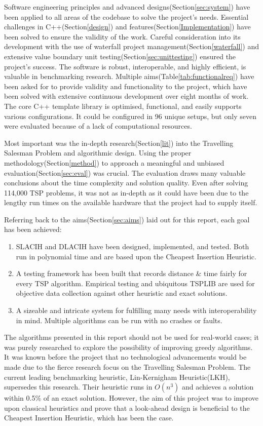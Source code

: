 Software engineering principles and advanced designs(Section\ref{sec:system}) have been applied to all areas of the codebase to solve the project's needs. Essential challenges in C++(Section\ref{design}) and features(Section\ref{Implementation}) have been solved to ensure the validity of the work. Careful consideration into its development with the use of waterfall project management(Section\ref{waterfall}) and extensive value boundary unit testing(Section\ref{sec:unittesting}) ensured the project's success. The software is robust, interoperable, and highly efficient, is valuable in benchmarking research. Multiple aims(Table\ref{tab:functionalreq}) have been asked for to provide validity and functionality to the project, which have been solved with extensive continuous development over eight months of work. The core C++ template library is optimised, functional, and easily supports various configurations. It could be configured in 96 unique setups, but only seven were evaluated because of a lack of computational resources. 

Most important was the in-depth research(Section\ref{lit}) into the Travelling Salesman Problem and algorithmic design. Using the proper methodology(Section\ref{method}) to approach a meaningful and unbiased evaluation(Section\ref{sec:eval}) was crucial. The evaluation draws many valuable conclusions about the time complexity and solution quality. Even after solving 114,000 TSP problems, it was not as in-depth as it could have been due to the lengthy run times on the available hardware that the project had to supply itself.

Referring back to the aims(Section\ref{sec:aims}) laid out for this report, each goal has been achieved:
\begin{enumerate}
  \item SLACIH and DLACIH have been designed, implemented, and tested. Both run in polynomial time and are based upon the Cheapest Insertion Heuristic.
  \item A testing framework has been built that records distance \& time fairly for every TSP algorithm. Empirical testing and ubiquitous TSPLIB are used for objective data collection against other heuristic and exact solutions.
  \item A sizeable and intricate system for fulfilling many needs with interoperability in mind. Multiple algorithms can be run with no crashes or faults.
\end{enumerate}

The algorithms presented in this report should not be used for real-world cases; it was purely researched to explore the possibility of improving greedy algorithms. It was known before the project that no technological advancements would be made due to the fierce research focus on the Travelling Salesman Problem. The current leading benchmarking heuristic, Lin-Kernigham Heuristic(LKH)\cite{Lin1973}, supersedes this research. Their heuristic runs in $O(n^3)$ and achieves a solution within 0.5\% of an exact solution\cite{HELSGAUN2000106}. However, the aim of this project was to improve upon classical heuristics and prove that a look-ahead design is beneficial to the Cheapest Insertion Heuristic, which has been the case.

